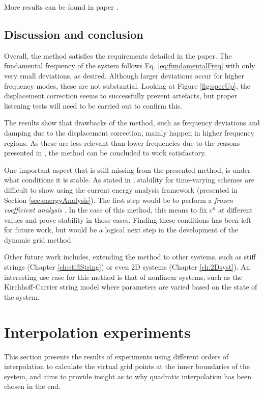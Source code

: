 More results can be found in paper \citeP[G]. 




\subsection{Discussion and conclusion}\label{sec:conclusion}

Overall, the method satisfies the requirements detailed in the paper. The fundamental frequency of the system follows Eq. \eqref{eq:fundamentalFreq} with only very small deviations, as desired. Although larger deviations occur for higher frequency modes, these are not substantial. Looking at Figure \ref{fig:specUp}, the displacement correction seems to successfully prevent artefacts, but proper listening tests will need to be carried out to confirm this.

The results show that drawbacks of the method, such as frequency deviations and damping due to the displacement correction, mainly happen in higher frequency regions. As these are less relevant than lower frequencies due to the reasons presented in \citeP[G], the method can be concluded to work satisfactory. 

One important aspect that is still missing from the presented method, is under what conditions it is stable. As stated in \cite{theBible}, stability for time-varying schemes are difficult to show using the current energy analysis framework (presented in Section \ref{sec:energyAnalysis}). The first step would be to perform a \textit{frozen coefficient analysis} \cite{Strikwerda1989}. In the case of this method, this means to fix $c^n$ at different values and prove stability in those cases. Finding these conditions has been left for future work, but would be a logical next step in the development of the dynamic grid method.

Other future work includes, extending the method to other systems, such as stiff strings (Chapter \ref{ch:stiffString}) or even 2D systems (Chapter \ref{ch:2Dsyst}). An interesting use case for this method is that of nonlinear systems, such as the Kirchhoff-Carrier string model \cite{Carrier1945} where parameters are varied based on the state of the system. 

\section{Interpolation experiments}\label{sec:iterations}
This section presents the results of experiments using different orders of interpolation to calculate the virtual grid points at the inner boundaries of the system, and aims to provide insight as to why quadratic interpolation has been chosen in the end. 

